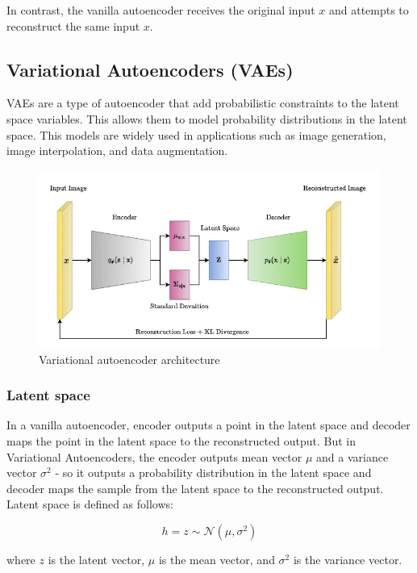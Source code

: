 \documentclass{article}
\begin{document}
			In contrast, the vanilla autoencoder receives the original input \(x\) and attempts to reconstruct the same input \(x\).

	\subsection{Variational Autoencoders (VAEs)}
			
		VAEs are a type of autoencoder that add probabilistic constraints to the latent space variables. This allows them to model probability distributions in the latent space.
		This models are widely used in applications such as image generation, image interpolation, and data augmentation.

		\begin{figure}[H]
			\centering
			\includegraphics[width=0.8\linewidth]{images/vae.png}
			\caption{Variational autoencoder architecture}
			\label{fig:vae}
		\end{figure}

		\subsubsection{Latent space}

			In a vanilla autoencoder, encoder outputs a point in the latent space and decoder maps the point in the latent space to the reconstructed output. \newline 
			But in Variational Autoencoders, the encoder outputs mean vector \(\mu\) and a variance vector \(\sigma^2\) - so it outputs a probability distribution in the latent space and decoder maps the sample from the latent space to the reconstructed output. \newline
			Latent space is defined as follows:

			\[ h = z \sim \mathcal{N}(\mu, \sigma^2) \]

			where \(z\) is the latent vector, \(\mu\) is the mean vector, and \(\sigma^2\) is the variance vector.
\end{document}

